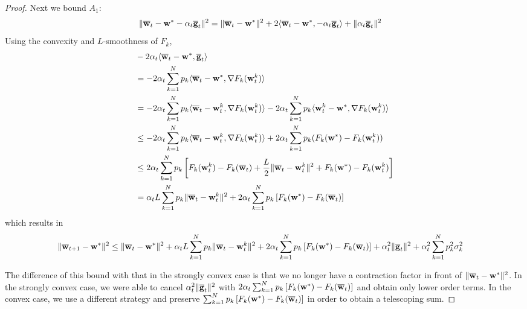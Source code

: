 \begin{proof}
	Next we bound $A_{1}$: 
	\begin{align*}
	\|{\overline{\mathbf{w}}}_{t}-{\mathbf{w}}^{\ast}-\alpha_{t}{\overline{\mathbf{g}}}_{t}\|^{2} & =\|{\overline{\mathbf{w}}}_{t}-{\mathbf{w}}^{\ast}\|^{2}+2\langle{\overline{\mathbf{w}}}_{t}-{\mathbf{w}}^{\ast},-\alpha_{t}{\overline{\mathbf{g}}}_{t}\rangle+\|\alpha_{t}{\overline{\mathbf{g}}}_{t}\|^{2}
	\end{align*}
	Using the convexity and $L$-smoothness of $F_{k}$, 
	\begin{align*}
	& -2\alpha_{t}\langle{\overline{\mathbf{w}}}_{t}-{\mathbf{w}}^{\ast},{\overline{\mathbf{g}}}_{t}\rangle\\
	& =-2\alpha_{t}\sum_{k=1}^{N}p_{k}\langle{\overline{\mathbf{w}}}_{t}-{\mathbf{w}}^{\ast},\nabla F_{k}({\mathbf{w}}_{t}^{k})\rangle\\
	& =-2\alpha_{t}\sum_{k=1}^{N}p_{k}\langle{\overline{\mathbf{w}}}_{t}-{\mathbf{w}}_{t}^{k},\nabla F_{k}({\mathbf{w}}_{t}^{k})\rangle-2\alpha_{t}\sum_{k=1}^{N}p_{k}\langle {\mathbf{w}}_{t}^{k}-{\mathbf{w}}^{\ast},\nabla F_{k}({\mathbf{w}}_{t}^{k})\rangle\\
	& \leq-2\alpha_{t}\sum_{k=1}^{N}p_{k}\langle{\overline{\mathbf{w}}}_{t}-{\mathbf{w}}_{t}^{k},\nabla F_{k}({\mathbf{w}}_{t}^{k})\rangle+2\alpha_{t}\sum_{k=1}^{N}p_{k}(F_{k}({\mathbf{w}}^{\ast})-F_{k}({\mathbf{w}}_{t}^{k}))\\
	& \leq2\alpha_{t}\sum_{k=1}^{N}p_{k}\left[F_{k}({\mathbf{w}}_{t}^{k})-F_{k}({\overline{\mathbf{w}}}_{t})+\frac{L}{2}\|{\overline{\mathbf{w}}}_{t}-{\mathbf{w}}_{t}^{k}\|^{2}+F_{k}({\mathbf{w}}^{\ast})-F_{k}({\mathbf{w}}_{t}^{k})\right]\\
	& =\alpha_{t}L\sum_{k=1}^{N}p_{k}\|{\overline{\mathbf{w}}}_{t}-{\mathbf{w}}_{t}^{k}\|^{2}+2\alpha_{t}\sum_{k=1}^{N}p_{k}\left[F_{k}({\mathbf{w}}^{\ast})-F_{k}({\overline{\mathbf{w}}}_{t})\right]
	\end{align*}
	which results in 
	\begin{align*}
	\|{\overline{\mathbf{w}}}_{t+1}-{\mathbf{w}}^{\ast}\|^{2} & \leq\|{\overline{\mathbf{w}}}_{t}-{\mathbf{w}}^{\ast}\|^{2}+\alpha_{t}L\sum_{k=1}^{N}p_{k}\|{\overline{\mathbf{w}}}_{t}-{\mathbf{w}}_{t}^{k}\|^{2}+2\alpha_{t}\sum_{k=1}^{N}p_{k}\left[F_{k}({\mathbf{w}}^{\ast})-F_{k}({\overline{\mathbf{w}}}_{t})\right]+\alpha_{t}^{2}\|{\overline{\mathbf{g}}}_{t}\|^{2}+\alpha_{t}^{2}\sum_{k=1}^{N}p_{k}^{2}\sigma_{k}^{2}
	\end{align*}
	
	The difference of this bound with that in the strongly convex case
	is that we no longer have a contraction factor in front of $\|{\overline{\mathbf{w}}}_{t}-{\mathbf{w}}^{\ast}\|^{2}$.
	In the strongly convex case, we were able to cancel $\alpha_{t}^{2}\|{\overline{\mathbf{g}}}_{t}\|^{2}$
	with $2\alpha_{t}\sum_{k=1}^{N}p_{k}\left[F_{k}({\mathbf{w}}^{\ast})-F_{k}({\overline{\mathbf{w}}}_{t})\right]$
	and obtain only lower order terms. In the convex case, we use a different
	strategy and preserve $\sum_{k=1}^{N}p_{k}\left[F_{k}({\mathbf{w}}^{\ast})-F_{k}({\overline{\mathbf{w}}}_{t})\right]$
	in order to obtain a telescoping sum. 
	

\end{proof}
